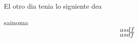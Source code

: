 \documentclass[10pt]{article}
\begin{document}
\crearEncabezado

\problema

\problema[Reactancia] El otro dia tenia lo siguiente dea

\begin{solucion}
    sainoma
    \begin{equation}
        asdf
    \end{equation}
    \begin{equation}
        asdf
    \end{equation}

\end{solucion}
\end{document}
